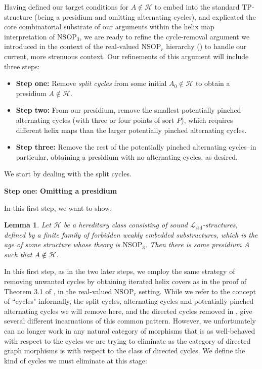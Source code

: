 \documentclass{amsart}
\newtheorem{lemma}[theorem]{Lemma}
\theoremstyle{definition}
\theoremstyle{remark}
\numberwithin{equation}{section}
\begin{document}
Having defined our target conditions for $A \notin \mathcal{H}$ to embed into the standard $\mathrm{TP}$-structure (being a presidium and omitting alternating cycles), and explicated the core combinatorial substrate of our arguments within the helix map interpretation of $\mathrm{NSOP}_{3}$, we are ready to refine the cycle-removal argument we introduced in the context of the real-valued $\mathrm{NSOP}_{r}$ hierarchy (\cite{ApproxOrder}) to handle our current, more strenuous context. Our refinements of this argument will include three steps:

\begin{itemize}
    \item \textbf{Step one:} Remove \textit{split cycles} from some initial $A_{0} \notin \mathcal{H}$ to obtain a presidium $A \notin \mathcal{H}$.
    \item \textbf{Step two:} From our presidium, remove the smallest potentially pinched alternating cycles (with three or four points of sort $P$), which requires different helix maps than the larger potentially pinched alternating cycles.
    \item \textbf{Step three:} Remove the rest of the potentially pinched alternating cycles--in particular, obtaining a presidium with no alternating cycles, as desired.
\end{itemize}


We start by dealing with the split cycles.

\:

\textbf{Step one: Omitting a presidium}

In this first step, we want to show:

\begin{lemma}
  \label{omitting a presidium}  Let $\mathcal{H}$ be a hereditary class consisting of sound $\mathcal{L}_{\mathrm{std}}$-structures, defined by a finite family of forbidden weakly embedded substructures, which is the age of some structure whose theory is $\mathrm{NSOP}_{3}$. Then there is some presidium $A$ such that $A \notin \mathcal{H}$.
\end{lemma}


In this first step, as in the two later steps, we employ the same strategy of removing unwanted cycles by obtaining iterated helix covers as in the proof of Theorem 3.1 of \cite{ApproxOrder}, in the real-valued $\mathrm{NSOP}_{r}$ setting. While we refer to the concept of ``cycles" informally, the split cycles, alternating cycles and potentially pinched alternating cycles we will remove here, and the directed cycles removed in \cite{ApproxOrder}, give several different incarnations of this common pattern. However, we unfortunately can no longer work in any natural category of morphisms that is as well-behaved with respect to the cycles we are trying to eliminate as the category of directed graph morphisms is with respect to the class of directed cycles. We define the kind of cycles we must eliminate at this stage:
\end{document}
